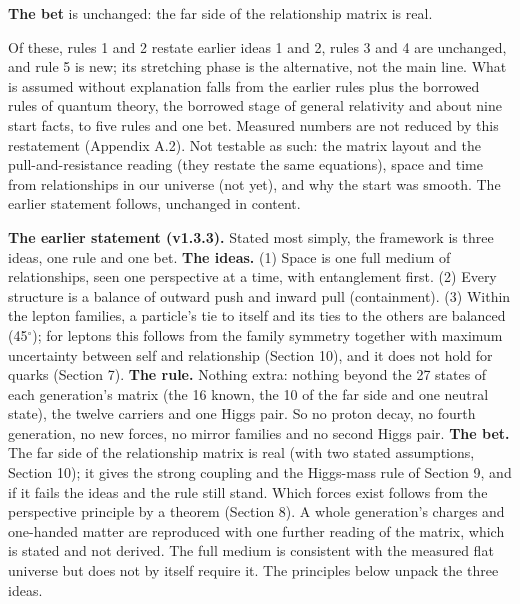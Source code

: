 \documentclass[
  11pt,
]{article}
\begin{document}
\textbf{The bet} is unchanged: the far side of the relationship matrix is real.

Of these, rules 1 and 2 restate earlier ideas 1 and 2, rules 3 and 4 are unchanged, and rule 5 is new; its stretching phase is the alternative, not the main line. What is assumed without explanation falls from the earlier rules plus the borrowed rules of quantum theory, the borrowed stage of general relativity and about nine start facts, to five rules and one bet. Measured numbers are not reduced by this restatement (Appendix A.2). Not testable as such: the matrix layout and the pull-and-resistance reading (they restate the same equations), space and time from relationships in our universe (not yet), and why the start was smooth. The earlier statement follows, unchanged in content.

\textbf{The earlier statement (v1.3.3).} Stated most simply, the framework is three ideas, one rule and one bet. \textbf{The ideas.} (1) Space is one full medium of relationships, seen one perspective at a time, with entanglement first. (2) Every structure is a balance of outward push and inward pull (containment). (3) Within the lepton families, a particle's tie to itself and its ties to the others are balanced (45\ensuremath{^\circ}); for leptons this follows from the family symmetry together with maximum uncertainty between self and relationship (Section 10), and it does not hold for quarks (Section 7). \textbf{The rule.} Nothing extra: nothing beyond the 27 states of each generation's matrix (the 16 known, the 10 of the far side and one neutral state), the twelve carriers and one Higgs pair. So no proton decay, no fourth generation, no new forces, no mirror families and no second Higgs pair. \textbf{The bet.} The far side of the relationship matrix is real (with two stated assumptions, Section 10); it gives the strong coupling and the Higgs-mass rule of Section 9, and if it fails the ideas and the rule still stand. Which forces exist follows from the perspective principle by a theorem (Section 8). A whole generation's charges and one-handed matter are reproduced with one further reading of the matrix, which is stated and not derived. The full medium is consistent with the measured flat universe but does not by itself require it. The principles below unpack the three ideas.
\end{document}
